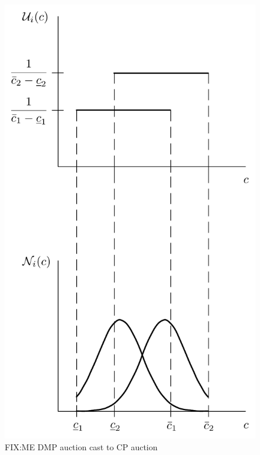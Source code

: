 \begin{figure}[p!]
  \includegraphics[width=\figsize]{Approximation/Figures/dmp_to_common_priors}
  \caption{FIX:ME DMP auction cast to CP auction}
  \label{fig:dmp_to_common_priors_approximation}
\end{figure}

